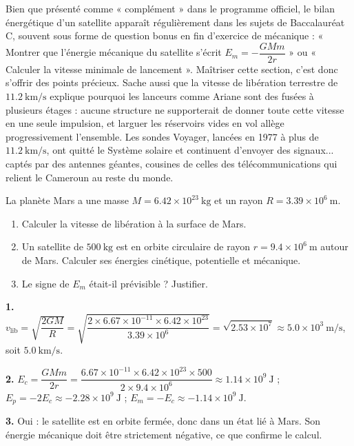 \documentclass[11pt]{article}
\begin{document}
\begin{savaistu}
Bien que présenté comme « complément » dans le programme officiel, le bilan énergétique d'un satellite apparaît régulièrement dans les sujets de Baccalauréat C, souvent sous forme de question bonus en fin d'exercice de mécanique : « Montrer que l'énergie mécanique du satellite s'écrit $E_m = -\dfrac{GMm}{2r}$ » ou « Calculer la vitesse minimale de lancement ». Maîtriser cette section, c'est donc s'offrir des points précieux. Sache aussi que la vitesse de libération terrestre de $\num{11,2}\ \mathrm{km/s}$ explique pourquoi les lanceurs comme Ariane sont des fusées à plusieurs étages : aucune structure ne supporterait de donner toute cette vitesse en une seule impulsion, et larguer les réservoirs vides en vol allège progressivement l'ensemble. Les sondes Voyager, lancées en 1977 à plus de $\num{11,2}\ \mathrm{km/s}$, ont quitté le Système solaire et continuent d'envoyer des signaux... captés par des antennes géantes, cousines de celles des télécommunications qui relient le Cameroun au reste du monde.
\end{savaistu}

\begin{exercice}
La planète Mars a une masse $M = \num{6,42}\times 10^{23}\ \mathrm{kg}$ et un rayon $R = \num{3,39}\times 10^{6}\ \mathrm{m}$.
\begin{enumerate}
\item Calculer la vitesse de libération à la surface de Mars.
\item Un satellite de $500\ \mathrm{kg}$ est en orbite circulaire de rayon $r = \num{9,4}\times 10^{6}\ \mathrm{m}$ autour de Mars. Calculer ses énergies cinétique, potentielle et mécanique.
\item Le signe de $E_m$ était-il prévisible ? Justifier.
\end{enumerate}
\end{exercice}

\begin{corrige}
\textbf{1.} $v_{\text{lib}} = \sqrt{\dfrac{2GM}{R}} = \sqrt{\dfrac{2\times \num{6,67}\times 10^{-11}\times \num{6,42}\times 10^{23}}{\num{3,39}\times 10^{6}}} = \sqrt{\num{2,53}\times 10^{7}} \approx \num{5,0}\times 10^{3}\ \mathrm{m/s}$, soit $\num{5,0}\ \mathrm{km/s}$.

\textbf{2.} $E_c = \dfrac{GMm}{2r} = \dfrac{\num{6,67}\times 10^{-11}\times \num{6,42}\times 10^{23}\times 500}{2\times \num{9,4}\times 10^{6}} \approx \num{1,14}\times 10^{9}\ \mathrm{J}$ ; $E_p = -2E_c \approx -\num{2,28}\times 10^{9}\ \mathrm{J}$ ; $E_m = -E_c \approx -\num{1,14}\times 10^{9}\ \mathrm{J}$.

\textbf{3.} Oui : le satellite est en orbite fermée, donc dans un état lié à Mars. Son énergie mécanique doit être strictement négative, ce que confirme le calcul.
\end{corrige}
\end{document}
